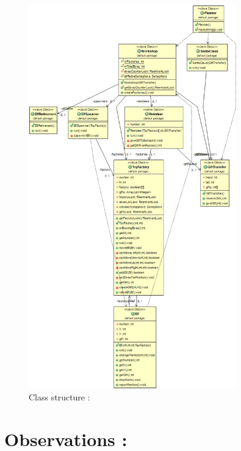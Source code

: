 \documentclass{article}
\begin{document}
\begin{figure}[t]
\caption{Class structure :}
\includegraphics[width=9cm]{UML.png}
\centering
\end{figure}

\section{\textbf{Observations :}}
\end{document}
